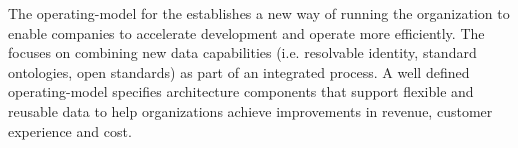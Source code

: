 %
%
The \gls{operating-model} for the  establishes a new way of running the organization
to enable companies to accelerate development and operate more efficiently.
The   focuses on
combining new data capabilities (i.e. resolvable identity, standard ontologies, open standards)
as part of an integrated process.
A well defined \gls{operating-model} specifies architecture components that support flexible and reusable data to help
organizations achieve improvements in revenue, customer experience and cost.


